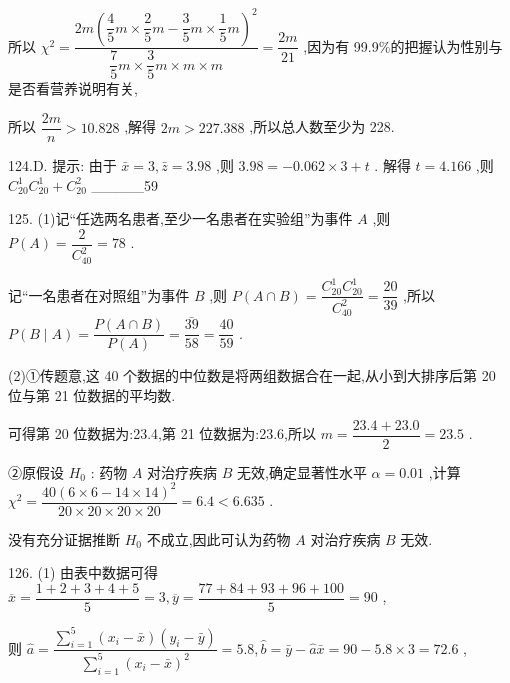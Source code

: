 所以 ${\chi }^{2} = \dfrac{{2m}{\left( \dfrac{4}{5}m \times  \dfrac{2}{5}m - \dfrac{3}{5}m \times  \dfrac{1}{5}m\right) }^{2}}{\dfrac{7}{5}m \times  \dfrac{3}{5}m \times  m \times  m} = \dfrac{2m}{21}$ ,因为有 99.9\%的把握认为性别与是否看营养说明有关,

所以 $\dfrac{2m}{n} > {10.828}$ ,解得 ${2m} > {227.388}$ ,所以总人数至少为 228.

124.D. 提示: 由于 $\bar{x} = 3,\bar{z} = {3.98}$ ,则 ${3.98} =  - {0.062} \times  3 + t$ . 解得 $t = {4.166}$ ,则 ${C}_{20}^{1}{C}_{20}^{1} + {C}_{20}^{2}$ \_\_\_\_\_59

125. (1)记“任选两名患者,至少一名患者在实验组”为事件 $A$ ,则 $P\left( A\right)  = \dfrac{2}{{C}_{40}^{2}} = {78}$ .

记“一名患者在对照组”为事件 $B$ ,则 $P\left( {A \cap  B}\right)  = \dfrac{{C}_{20}^{1}{C}_{20}^{1}}{{C}_{40}^{2}} = \dfrac{20}{39}$ ,所以 $P\left( {B \mid  A}\right)  = \dfrac{P\left( {A \cap  B}\right) }{P\left( A\right) } = \dfrac{\bar{39}}{58} = \dfrac{40}{59}$ .

(2)①传题意,这 40 个数据的中位数是将两组数据合在一起,从小到大排序后第 20 位与第 21 位数据的平均数.

可得第 20 位数据为:23.4,第 21 位数据为:23.6,所以 $m = \dfrac{{23.4} + {23.0}}{2} = {23.5}$ .

\begin{center}
\end{center}

②原假设 ${H}_{0}$ : 药物 $A$ 对治疗疾病 $B$ 无效,确定显著性水平 $\alpha  = {0.01}$ ,计算 ${\chi }^{2} = \dfrac{{40}{\left( 6 \times  6 - {14} \times  {14}\right) }^{2}}{{20} \times  {20} \times  {20} \times  {20}} = {6.4} < {6.635}$ .

没有充分证据推断 ${H}_{0}$ 不成立,因此可认为药物 $A$ 对治疗疾病 $B$ 无效.

126. (1) 由表中数据可得 $\overline{x} = \dfrac{1 + 2 + 3 + 4 + 5}{5} = 3,\overline{y} = \dfrac{{77} + {84} + {93} + {96} + {100}}{5} = {90}$ ,

则 $\widehat{a} = \dfrac{\mathop{\sum }\limits_{{i = 1}}^{5}\left( {{x}_{i} - \bar{x}}\right) \left( {{y}_{i} - \bar{y}}\right) }{\mathop{\sum }\limits_{{i = 1}}^{5}{\left( {x}_{i} - \bar{x}\right) }^{2}} = {5.8},\widehat{b} = \bar{y} - \widehat{a}\bar{x} = {90} - {5.8} \times  3 = {72.6}$ ,


